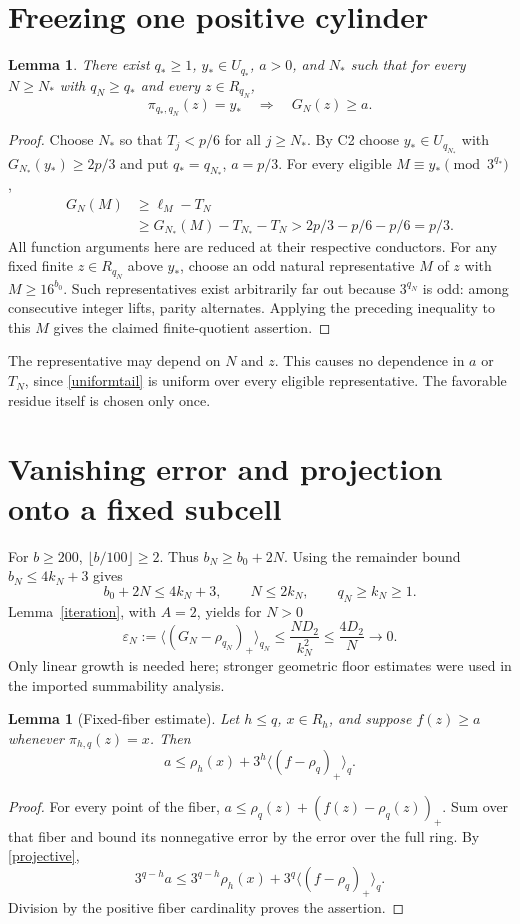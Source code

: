 \documentclass[11pt,a4paper]{article}
\newtheorem{lemma}[theorem]{Lemma}
\theoremstyle{definition}\newtheorem{definition}[theorem]{Definition}
\theoremstyle{remark}\newtheorem{remark}[theorem]{Remark}
\newcommand{\proj}[2]{\pi_{#1,#2}}
\newcommand{\av}[2]{\langle #2\rangle_{#1}}
\begin{document}
\section{Freezing one positive cylinder}
\begin{lemma}\label{fixed}
There exist $q_*\ge1$, $y_*\in U_{q_*}$, $a>0$, and $N_*$ such that
for every $N\ge N_*$ with $q_N\ge q_*$ and every $z\in R_{q_N}$,
\[
 \proj{q_*}{q_N}(z)=y_*\quad\Longrightarrow\quad G_N(z)\ge a.
\]
\end{lemma}
\begin{proof}
Choose $N_*$ so that $T_j<p/6$ for all $j\ge N_*$. By C2 choose
$y_*\in U_{q_{N_*}}$ with $G_{N_*}(y_*)\ge2p/3$ and put
$q_*=q_{N_*}$, $a=p/3$. For every eligible $M\equiv y_*\pmod{3^{q_*}}$,
\begin{align*}
 G_N(M)&\ge\ell_M-T_N\\
       &\ge G_{N_*}(M)-T_{N_*}-T_N>2p/3-p/6-p/6=p/3.
\end{align*}
All function arguments here are reduced at their respective conductors.
For any fixed finite $z\in R_{q_N}$ above $y_*$, choose an odd natural
representative $M$ of $z$ with $M\ge16^{b_0}$. Such representatives exist
arbitrarily far out because $3^{q_N}$ is odd: among consecutive integer
lifts, parity alternates. Applying the preceding inequality to this $M$
gives the claimed finite-quotient assertion.
\end{proof}
The representative may depend on $N$ and $z$. This causes no dependence
in $a$ or $T_N$, since \eqref{uniformtail} is uniform over every eligible
representative. The favorable residue itself is chosen only once.

\section{Vanishing error and projection onto a fixed subcell}
For $b\ge200$, $\lfloor b/100\rfloor\ge2$. Thus $b_N\ge b_0+2N$.
Using the remainder bound $b_N\le4k_N+3$ gives
\[
 b_0+2N\le4k_N+3,\qquad N\le2k_N,\qquad q_N\ge k_N\ge1.
\]
Lemma~\ref{iteration}, with $A=2$, yields for $N>0$
\begin{equation}\label{error}
 \varepsilon_N:=\av{q_N}{(G_N-\rho_{q_N})_+}
 \le\frac{ND_2}{k_N^2}\le\frac{4D_2}{N}\longrightarrow0.
\end{equation}
Only linear growth is needed here; stronger geometric floor estimates
were used in the imported summability analysis.

\begin{lemma}[Fixed-fiber estimate]\label{fiber}
Let $h\le q$, $x\in R_h$, and suppose $f(z)\ge a$ whenever
$\proj hq(z)=x$. Then
\[
 a\le\rho_h(x)+3^h\av q{(f-\rho_q)_+}.
\]
\end{lemma}
\begin{proof}
For every point of the fiber,
$a\le\rho_q(z)+(f(z)-\rho_q(z))_+$. Sum over that fiber and bound its
nonnegative error by the error over the full ring. By \eqref{projective},
\[
 3^{q-h}a\le3^{q-h}\rho_h(x)+3^q\av q{(f-\rho_q)_+}.
\]
Division by the positive fiber cardinality proves the assertion.
\end{proof}
\end{document}
